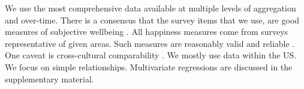\documentclass[10pt, letterpaper]{article}
\begin{document}
\begin{spacing}{1.0}





We use the most comprehensive data available at multiple levels of aggregation
and over-time. There is a consensus that the survey items that we use, are good
measures of subjective wellbeing \citep{diener09,oswald09w,stiglitz09al}.
 All happiness measures come from surveys representative of given areas. Such measures are reasonably valid and
reliable \citep{diener13b}. %
One caveat is cross-cultural comparability \citep{diener03b}. %
 We mostly use data within the US. %
We focus on simple relationships. Multivariate regressions are
discussed in the supplementary material. 




\end{spacing}
\end{document}
